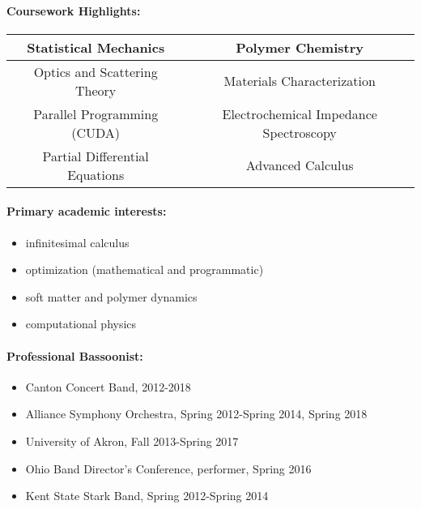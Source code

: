 \documentclass{my_cv}
\begin{document}
\paragraph{Coursework Highlights:}
\begin{center}
\begin{tabular}{c|c}
    Statistical Mechanics & Polymer Chemistry \\
    \hline
    Optics and Scattering Theory & Materials Characterization \\
    \hline
    Parallel Programming (CUDA) & Electrochemical Impedance Spectroscopy \\
    \hline
    Partial Differential Equations & Advanced Calculus \\
\end{tabular}
\end{center}

\paragraph{Primary academic interests:}
\begin{itemize}
    \item infinitesimal calculus
    \item optimization (mathematical and programmatic)
    \item soft matter and polymer dynamics
    \item computational physics
\end{itemize}

\paragraph{Professional Bassoonist:}
\begin{itemize}
	\item Canton Concert Band, 2012-2018
	\item Alliance Symphony Orchestra, Spring 2012-Spring 2014, Spring 2018
    \item University of Akron, Fall 2013-Spring 2017
	\item Ohio Band Director’s Conference, performer, Spring 2016
	\item Kent State Stark Band, Spring 2012-Spring 2014
\end{itemize}
\end{document}
